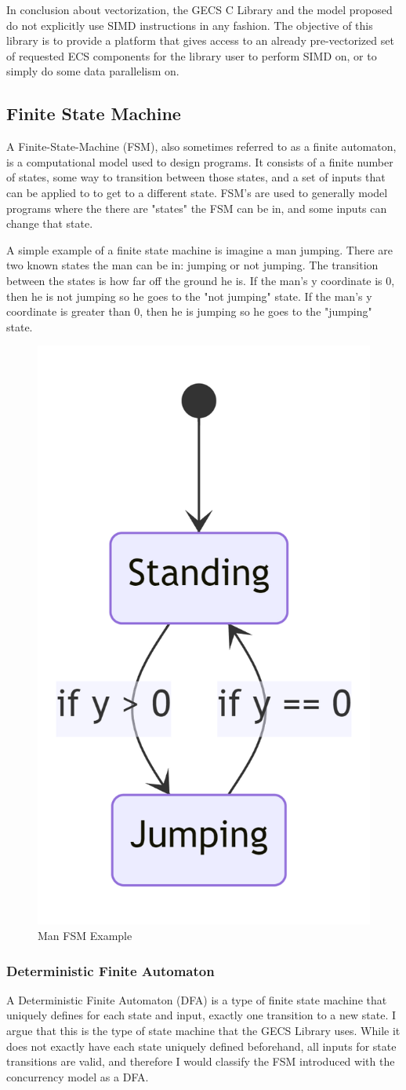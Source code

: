 In conclusion about vectorization, the GECS C Library and the model proposed do not explicitly use SIMD instructions in any fashion. The objective of this library is to provide a platform that gives access to an already pre-vectorized set of requested ECS components for the library user to perform SIMD on, or to simply do some data parallelism on.

\subsection{Finite State Machine}
A Finite-State-Machine (FSM), also sometimes referred to as a finite automaton, is a computational model used to design programs. It consists of a finite number of states, some way to transition between those states, and a set of inputs that can be applied to to get to a different state. FSM's are used to generally model programs where the there are "states" the FSM can be in, and some inputs can change that state. 

A simple example of a finite state machine is imagine a man jumping. There are two known states the man can be in: jumping or not jumping. The transition between the states is how far off the ground he is. If the man's y coordinate is 0, then he is not jumping so he goes to the "not jumping" state. If the man's y coordinate is greater than 0, then he is jumping so he goes to the "jumping" state.

\begin{figure}[H]
    \centering
    \includegraphics[width=0.25\linewidth]{resources/man_fsm_example.png}
    \caption{Man FSM Example}
    \label{fig:graph2}
\end{figure}

\subsubsection{Deterministic Finite Automaton}
A Deterministic Finite Automaton (DFA) is a type of finite state machine that uniquely defines for each state and input, exactly one transition to a new state. I argue that this is the type of state machine that the GECS Library uses. While it does not exactly have each state uniquely defined beforehand, all inputs for state transitions are valid, and therefore I would classify the FSM introduced with the concurrency model as a DFA.

